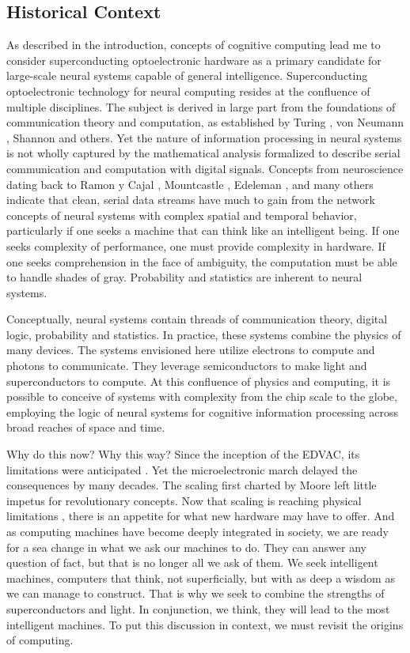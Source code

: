 \subsection{\label{sec:history}Historical Context}
As described in the introduction, concepts of cognitive computing lead me to consider superconducting optoelectronic hardware as a primary candidate for large-scale neural systems capable of general intelligence. Superconducting optoelectronic technology for neural computing resides at the confluence of multiple disciplines. The subject is derived in large part from the foundations of communication theory and computation, as established by Turing \cite{tu1936}, von Neumann \cite{ne1945}, Shannon \cite{sh1948} and others. Yet the nature of information processing in neural systems is not wholly captured by the mathematical analysis formalized to describe serial communication and computation with digital signals. Concepts from neuroscience dating back to Ramon y Cajal \cite{ra1908}, Mountcastle \cite{mo1978}, Edeleman \cite{ed1978}, and many others indicate that clean, serial data streams have much to gain from the network concepts of neural systems with complex spatial and temporal behavior, particularly if one seeks a machine that can think like an intelligent being. If one seeks complexity of performance, one must provide complexity in hardware. If one seeks comprehension in the face of ambiguity, the computation must be able to handle shades of gray. Probability and statistics are inherent to neural systems. 

Conceptually, neural systems contain threads of communication theory, digital logic, probability and statistics. In practice, these systems combine the physics of many devices. The systems envisioned here utilize electrons to compute and photons to communicate. They leverage semiconductors to make light and superconductors to compute. At this confluence of physics and computing, it is possible to conceive of systems with complexity from the chip scale to the globe, employing the logic of neural systems for cognitive information processing across broad reaches of space and time. 

Why do this now? Why this way? Since the inception of the EDVAC, its limitations were anticipated \cite{}. Yet the microelectronic march delayed the consequences by many decades. The scaling first charted by Moore \cite{mo1965} left little impetus for revolutionary concepts. Now that scaling is reaching physical limitations \cite{}, there is an appetite for what new hardware may have to offer. And as computing machines have become deeply integrated in society, we are ready for a sea change in what we ask our machines to do. They can answer any question of fact, but that is no longer all we ask of them. We seek intelligent machines, computers that think, not superficially, but with as deep a wisdom as we can manage to construct. That is why we seek to combine the strengths of superconductors and light. In conjunction, we think, they will lead to the most intelligent machines. To put this discussion in context, we must revisit the origins of computing.

